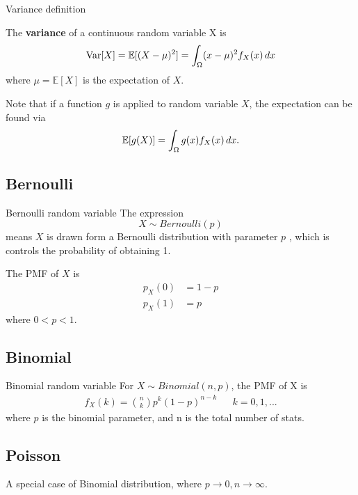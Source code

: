 \begin{fact}{Variance definition}{}

    The \textbf{variance} of a continuous random variable X is
    \begin{equation*}
        \mathrm{Var}[X] = \mathbb{E}[(X-\mu)^2]=\int_{\Omega}(x-\mu)^2f_X(x)\,dx
    \end{equation*}
    where $\mu=\mathbb{E}[X]$ is the expectation of $X$.
\end{fact}

Note that if a function $g$ is applied to random variable $X$, the expectation can be found via
\begin{equation*}
  \mathbb{E}[g(X)]=\int_{\Omega}g(x)f_X(x)\,dx.
\end{equation*}

\subsection{Bernoulli}

\begin{fact}{Bernoulli random variable}{}
    The expression
    \begin{equation*}
        X \sim Bernoulli(p)
    \end{equation*}
    means $X$ is drawn form a Bernoulli distribution with parameter $p$
    , which is controls the probability of obtaining 1.

    The PMF of $X$ is
    \begin{align*}
        p_X(0) &= 1-p\\
        p_X(1) &= p
    \end{align*}
    where $0<p<1$.
\end{fact}

\subsection{Binomial}

\begin{fact}{Binomial random variable}{}
  For $X \sim Binomial(n,p)$, the PMF of X is
  \begin{align*}
    f_X(k) = \binom{n}{k}p^k(1-p)^{n-k} &&k=0,1,...
  \end{align*}
  where $p$ is the binomial parameter, and n is the total number of stats.
\end{fact}

\subsection{Poisson}
A special case of Binomial distribution, where $p\rightarrow0,n\rightarrow\infty$.

